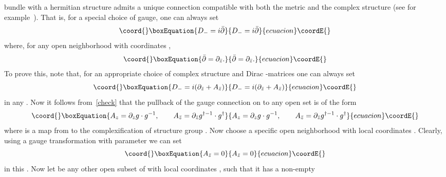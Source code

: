 \documentclass[a4paper,12pt]{article}
\numberwithin{equation}{section}
\theoremstyle{plain}
\begin{document}
bundle with a hermitian structure admits a unique connection compatible
with
both the metric and the complex
structure (see for example~\cite{GH}). That is,
for a special choice
of gauge, one can always set
%
\begin{equation}\coord{}\boxEquation{
D_{-} = i\bar \partial
\label{doublecheck}
}{
D_{-} = i\bar \partial
}{ecuacion}\coordE{}\end{equation}
%
where, for any open neighborhood \coordHE{} with coordinates
\coordHE{},
%
\begin{equation}\coord{}\boxEquation{
\bar \partial = \partial_{\bar z}.
\label{19}
}{
\bar \partial = \partial_{\bar z}.
}{ecuacion}\coordE{}\end{equation}
%
To prove this, note that, for an appropriate choice of complex structure
and
Dirac \myHighlight{$\gamma$}\coordHE{}-matrices one can always set
%
\begin{equation}\coord{}\boxEquation{
D_{-} = i(\partial_{\bar z} + A_{\bar z})
\label{bar}
}{
D_{-} = i(\partial_{\bar z} + A_{\bar z})
}{ecuacion}\coordE{}\end{equation}
%
in any \coordHE{}. Now it follows from~\eqref{check} that
the pullback of the gauge connection on \coordHE{} to any open set
\coordHE{} is of the form
%
\begin{equation}\coord{}\boxEquation{
A_{z} = \partial_{z} g \cdot g^{-1},
\qquad A_{\bar z} = \partial_{\bar z} g^{\dagger -1}\cdot
g^{\dagger}
\label{21}
}{
A_{z} = \partial_{z} g \cdot g^{-1},
\qquad A_{\bar z} = \partial_{\bar z} g^{\dagger -1}\cdot
g^{\dagger}
}{ecuacion}\coordE{}\end{equation}
%
where \coordHE{} is a map from \coordHE{} to the complexification of structure
group \coordHE{}.
Now choose
a specific open neighborhood \coordHE{} with local coordinates
\coordHE{}. Clearly, using a gauge transformation with parameter
\coordHE{} we can set
%
\begin{equation}\coord{}\boxEquation{
A_{\bar z} =0
\label{triplecheck}
}{
A_{\bar z} =0
}{ecuacion}\coordE{}\end{equation}
%
in this \coordHE{}. Now let \coordHE{} be any other open subset of \coordHE{}
with local
coordinates \coordHE{} , such that it has a non-empty
\end{document}
